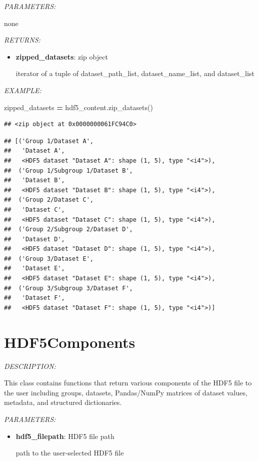 \documentclass[
]{article}
\newenvironment{Shaded}{\begin{snugshade}}{\end{snugshade}}
\newcommand{\NormalTok}[1]{#1}
\newcommand{\OperatorTok}[1]{\textcolor[rgb]{0.81,0.36,0.00}{\textbf{#1}}}
\begin{document}
\emph{PARAMETERS:}

none

\emph{RETURNS:}

\begin{itemize}
\item
  \textbf{zipped\_datasets}: zip object

  iterator of a tuple of dataset\_path\_list, dataset\_name\_list, and dataset\_list
\end{itemize}

\emph{EXAMPLE:}

\begin{Shaded}
\begin{Highlighting}[]
\NormalTok{zipped_datasets }\OperatorTok{=}\NormalTok{ hdf5_content.zip_datasets()}
\end{Highlighting}
\end{Shaded}

\begin{verbatim}
## <zip object at 0x0000000061FC94C0>
\end{verbatim}

\begin{verbatim}
## [('Group 1/Dataset A',
##   'Dataset A',
##   <HDF5 dataset "Dataset A": shape (1, 5), type "<i4">),
##  ('Group 1/Subgroup 1/Dataset B',
##   'Dataset B',
##   <HDF5 dataset "Dataset B": shape (1, 5), type "<i4">),
##  ('Group 2/Dataset C',
##   'Dataset C',
##   <HDF5 dataset "Dataset C": shape (1, 5), type "<i4">),
##  ('Group 2/Subgroup 2/Dataset D',
##   'Dataset D',
##   <HDF5 dataset "Dataset D": shape (1, 5), type "<i4">),
##  ('Group 3/Dataset E',
##   'Dataset E',
##   <HDF5 dataset "Dataset E": shape (1, 5), type "<i4">),
##  ('Group 3/Subgroup 3/Dataset F',
##   'Dataset F',
##   <HDF5 dataset "Dataset F": shape (1, 5), type "<i4">)]
\end{verbatim}

\hypertarget{hdf5components}{%
\section{HDF5Components}\label{hdf5components}}

\emph{DESCRIPTION:}

This class contains functions that return various components of the HDF5 file to the user including groups, datasets, Pandas/NumPy matrices of dataset values, metadata, and structured dictionaries.

\emph{PARAMETERS:}

\begin{itemize}
\item
  \textbf{hdf5\_filepath}: HDF5 file path

  path to the user-selected HDF5 file
\end{itemize}
\end{document}
